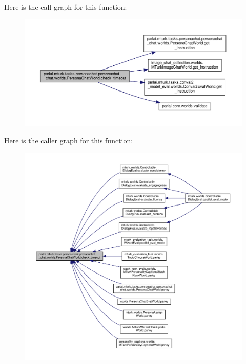 Here is the call graph for this function\+:
\nopagebreak
\begin{figure}[H]
\begin{center}
\leavevmode
\includegraphics[width=350pt]{classparlai_1_1mturk_1_1tasks_1_1personachat_1_1personachat__chat_1_1worlds_1_1PersonaChatWorld_a2d3f943d1fd0d1bff5af9fdcae160439_cgraph}
\end{center}
\end{figure}
Here is the caller graph for this function\+:
\nopagebreak
\begin{figure}[H]
\begin{center}
\leavevmode
\includegraphics[width=350pt]{classparlai_1_1mturk_1_1tasks_1_1personachat_1_1personachat__chat_1_1worlds_1_1PersonaChatWorld_a2d3f943d1fd0d1bff5af9fdcae160439_icgraph}
\end{center}
\end{figure}
\mbox{\label{classparlai_1_1mturk_1_1tasks_1_1personachat_1_1personachat__chat_1_1worlds_1_1PersonaChatWorld_a9497024a85da74e69e5b6a1568b5ff18}} 
